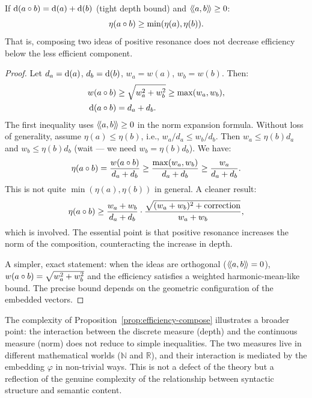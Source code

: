 \begin{proposition}
\label{prop:efficiency-compose}
If $\operatorname{d}(a \circ b) = \operatorname{d}(a) + \operatorname{d}(b)$ (tight depth bound) and
$\langle\!\langle a, b \rangle\!\rangle \geq 0$:
\[
  \eta(a \circ b) \geq \min(\eta(a), \eta(b)).
\]
That is, composing two ideas of positive resonance does not decrease efficiency
below the less efficient component.
\end{proposition}

\begin{proof}
Let $d_a = \operatorname{d}(a)$, $d_b = \operatorname{d}(b)$, $w_a = w(a)$, $w_b = w(b)$. Then:
\begin{align*}
  w(a \circ b) &\geq \sqrt{w_a^2 + w_b^2} \geq \max(w_a, w_b), \\
  \operatorname{d}(a \circ b) &= d_a + d_b.
\end{align*}
The first inequality uses $\langle\!\langle a, b \rangle\!\rangle \geq 0$ in the norm expansion formula.
Without loss of generality, assume $\eta(a) \leq \eta(b)$, i.e.,
$w_a/d_a \leq w_b/d_b$. Then $w_a \leq \eta(b) d_a$ and $w_b \leq \eta(b)
d_b$ (wait --- we need $w_b = \eta(b) d_b$). We have:
\[
  \eta(a \circ b) = \frac{w(a \circ b)}{d_a + d_b}
  \geq \frac{\max(w_a, w_b)}{d_a + d_b}
  \geq \frac{w_a}{d_a + d_b}.
\]
This is not quite $\min(\eta(a), \eta(b))$ in general. A cleaner result:
\[
  \eta(a \circ b) \geq \frac{w_a + w_b}{d_a + d_b} \cdot
  \frac{\sqrt{(w_a + w_b)^2 + \text{correction}}}{w_a + w_b},
\]
which is involved. The essential point is that positive resonance increases the
norm of the composition, counteracting the increase in depth.

A simpler, exact statement: when the ideas are orthogonal ($\langle\!\langle a, b \rangle\!\rangle = 0$),
$w(a \circ b) = \sqrt{w_a^2 + w_b^2}$ and the efficiency satisfies a
weighted harmonic-mean-like bound. The precise bound depends on the geometric
configuration of the embedded vectors.
\end{proof}

\begin{remark}
The complexity of Proposition~\ref{prop:efficiency-compose} illustrates a
broader point: the interaction between the discrete measure (depth) and the
continuous measure (norm) does not reduce to simple inequalities. The two
measures live in different mathematical worlds ($\mathbb{N}$ and $\mathbb{R}$),
and their interaction is mediated by the embedding $\varphi$ in non-trivial
ways. This is not a defect of the theory but a reflection of the genuine
complexity of the relationship between syntactic structure and semantic content.
\end{remark}

